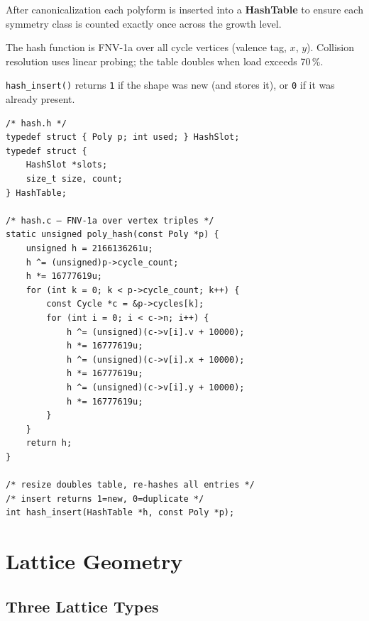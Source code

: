 \documentclass[10pt,a4paper]{article}
\let\polysection\section
\renewcommand\section{\needspace{0.16\textheight}\polysection}
\let\polysubsection\subsection
\renewcommand\subsection{\needspace{0.12\textheight}\polysubsection}
\newcommand{\code}[1]{\texttt{\small #1}}
\newcommand{\file}[1]{\texttt{\footnotesize #1}}
\begin{document}
\begin{tcolorbox}[dualbox, title=Open-addressing Hash Table — \file{src/core/hash.h\,/\,hash.c}]
  After canonicalization each polyform is inserted into a
  \textbf{HashTable} to ensure each symmetry class is counted exactly
  once across the growth level.

  The hash function is FNV-1a over all cycle vertices (valence tag,
  $x$, $y$).  Collision resolution uses linear probing; the table
  doubles when load exceeds 70\,\%.

  \code{hash\_insert()} returns \code{1} if the shape was new
  (and stores it), or \code{0} if it was already present.
\tcblower
\begin{verbatim}
/* hash.h */
typedef struct { Poly p; int used; } HashSlot;
typedef struct {
    HashSlot *slots;
    size_t size, count;
} HashTable;

/* hash.c — FNV-1a over vertex triples */
static unsigned poly_hash(const Poly *p) {
    unsigned h = 2166136261u;
    h ^= (unsigned)p->cycle_count;
    h *= 16777619u;
    for (int k = 0; k < p->cycle_count; k++) {
        const Cycle *c = &p->cycles[k];
        for (int i = 0; i < c->n; i++) {
            h ^= (unsigned)(c->v[i].v + 10000);
            h *= 16777619u;
            h ^= (unsigned)(c->v[i].x + 10000);
            h *= 16777619u;
            h ^= (unsigned)(c->v[i].y + 10000);
            h *= 16777619u;
        }
    }
    return h;
}

/* resize doubles table, re-hashes all entries */
/* insert returns 1=new, 0=duplicate */
int hash_insert(HashTable *h, const Poly *p);
\end{verbatim}
\end{tcolorbox}

\section{Lattice Geometry}

\subsection{Three Lattice Types}
\end{document}
